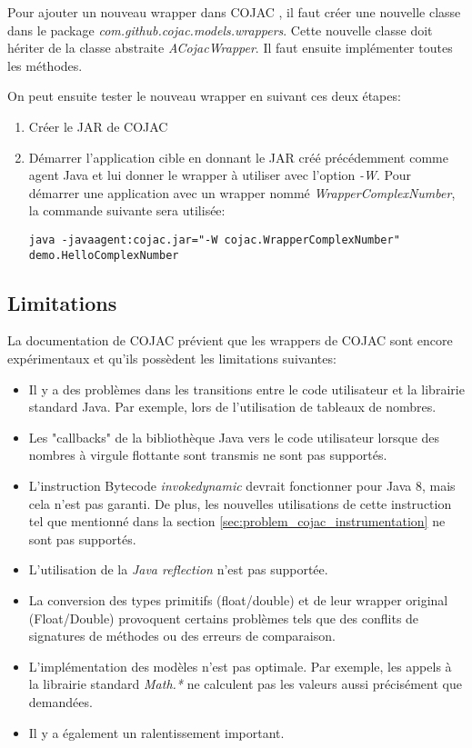 Pour ajouter un nouveau wrapper dans COJAC \cite{COJAC}, il faut créer une nouvelle classe dans le package \textit{com.github.cojac.models.wrappers}. Cette nouvelle classe doit hériter de la classe abstraite \textit{ACojacWrapper}. Il faut ensuite implémenter toutes les méthodes.

On peut ensuite tester le nouveau wrapper en suivant ces deux étapes:
\begin{enumerate}
    \item Créer le JAR de COJAC
    \item Démarrer l'application cible en donnant le JAR créé précédemment comme agent Java et lui donner le wrapper à utiliser avec l'option \textit{-W}. Pour démarrer une application avec un wrapper nommé \textit{WrapperComplexNumber}, la commande suivante sera utilisée:
    \begin{verbatim}
java -javaagent:cojac.jar="-W cojac.WrapperComplexNumber" demo.HelloComplexNumber
    \end{verbatim}
\end{enumerate}

\subsection{Limitations}

La documentation de COJAC \cite{cojac-wiki-limitations} prévient que les wrappers de COJAC sont encore expérimentaux et qu'ils possèdent les limitations suivantes:

\begin{itemize}
    \item Il y a des problèmes dans les transitions entre le code utilisateur et la librairie standard Java. Par exemple, lors de l'utilisation de tableaux de nombres.
    \item Les "callbacks" de la bibliothèque Java vers le code utilisateur lorsque des nombres à virgule flottante sont transmis ne sont pas supportés.
    \item L'instruction Bytecode \textit{invokedynamic} devrait fonctionner pour Java 8, mais cela n'est pas garanti. De plus, les nouvelles utilisations de cette instruction tel que mentionné dans la section \ref{sec:problem_cojac_instrumentation} ne sont pas supportés.
    \item L'utilisation de la \textit{Java reflection} n'est pas supportée.
    \item La conversion des types primitifs (float/double) et de leur wrapper original (Float/\hspace{0pt}Double) provoquent certains problèmes tels que des conflits de signatures de méthodes ou des erreurs de comparaison.
    \item L'implémentation des modèles n'est pas optimale. Par exemple, les appels à la librairie standard \textit{Math.*} ne calculent pas les valeurs aussi précisément que demandées.
    \item Il y a également un ralentissement important.
\end{itemize}

